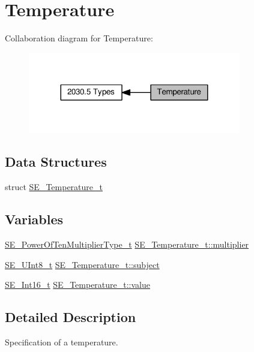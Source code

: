 \hypertarget{group__Temperature}{}\section{Temperature}
\label{group__Temperature}
Collaboration diagram for Temperature\+:\nopagebreak
\begin{figure}[H]
\begin{center}
\leavevmode
\includegraphics[width=263pt]{group__Temperature}
\end{center}
\end{figure}
\subsection*{Data Structures}
\begin{DoxyCompactItemize}
\item 
struct \hyperlink{structSE__Temperature__t}{S\+E\+\_\+\+Temperature\+\_\+t}
\end{DoxyCompactItemize}
\subsection*{Variables}
\begin{DoxyCompactItemize}
\item 
\hyperlink{group__PowerOfTenMultiplierType_gaf0317b781dc8dbb9cb6ac4e44a14fdef}{S\+E\+\_\+\+Power\+Of\+Ten\+Multiplier\+Type\+\_\+t} \hyperlink{group__Temperature_ga0e1fe0344bacec2b9b548fe575158e69}{S\+E\+\_\+\+Temperature\+\_\+t\+::multiplier}
\item 
\hyperlink{group__UInt8_gaf7c365a1acfe204e3a67c16ed44572f5}{S\+E\+\_\+\+U\+Int8\+\_\+t} \hyperlink{group__Temperature_ga59d44f7aa6422a7f439a3637c1adcf3a}{S\+E\+\_\+\+Temperature\+\_\+t\+::subject}
\item 
\hyperlink{group__Int16_ga0d600c7df811a7d4b4816e8965877690}{S\+E\+\_\+\+Int16\+\_\+t} \hyperlink{group__Temperature_ga466376bcb700edec44b9601bd2441605}{S\+E\+\_\+\+Temperature\+\_\+t\+::value}
\end{DoxyCompactItemize}


\subsection{Detailed Description}
Specification of a temperature. 

